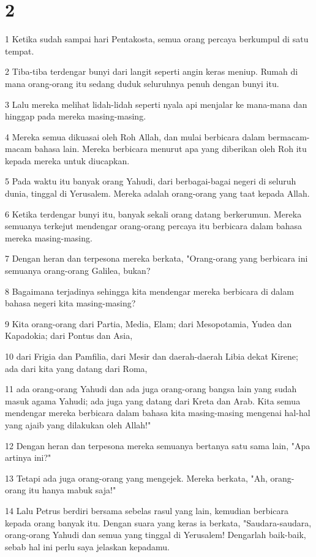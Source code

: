 \chapter{2}

\par 1 Ketika sudah sampai hari Pentakosta, semua orang percaya berkumpul di satu tempat.
\par 2 Tiba-tiba terdengar bunyi dari langit seperti angin keras meniup. Rumah di mana orang-orang itu sedang duduk seluruhnya penuh dengan bunyi itu.
\par 3 Lalu mereka melihat lidah-lidah seperti nyala api menjalar ke mana-mana dan hinggap pada mereka masing-masing.
\par 4 Mereka semua dikuasai oleh Roh Allah, dan mulai berbicara dalam bermacam-macam bahasa lain. Mereka berbicara menurut apa yang diberikan oleh Roh itu kepada mereka untuk diucapkan.
\par 5 Pada waktu itu banyak orang Yahudi, dari berbagai-bagai negeri di seluruh dunia, tinggal di Yerusalem. Mereka adalah orang-orang yang taat kepada Allah.
\par 6 Ketika terdengar bunyi itu, banyak sekali orang datang berkerumun. Mereka semuanya terkejut mendengar orang-orang percaya itu berbicara dalam bahasa mereka masing-masing.
\par 7 Dengan heran dan terpesona mereka berkata, "Orang-orang yang berbicara ini semuanya orang-orang Galilea, bukan?
\par 8 Bagaimana terjadinya sehingga kita mendengar mereka berbicara di dalam bahasa negeri kita masing-masing?
\par 9 Kita orang-orang dari Partia, Media, Elam; dari Mesopotamia, Yudea dan Kapadokia; dari Pontus dan Asia,
\par 10 dari Frigia dan Pamfilia, dari Mesir dan daerah-daerah Libia dekat Kirene; ada dari kita yang datang dari Roma,
\par 11 ada orang-orang Yahudi dan ada juga orang-orang bangsa lain yang sudah masuk agama Yahudi; ada juga yang datang dari Kreta dan Arab. Kita semua mendengar mereka berbicara dalam bahasa kita masing-masing mengenai hal-hal yang ajaib yang dilakukan oleh Allah!"
\par 12 Dengan heran dan terpesona mereka semuanya bertanya satu sama lain, "Apa artinya ini?"
\par 13 Tetapi ada juga orang-orang yang mengejek. Mereka berkata, "Ah, orang-orang itu hanya mabuk saja!"
\par 14 Lalu Petrus berdiri bersama sebelas rasul yang lain, kemudian berbicara kepada orang banyak itu. Dengan suara yang keras ia berkata, "Saudara-saudara, orang-orang Yahudi dan semua yang tinggal di Yerusalem! Dengarlah baik-baik, sebab hal ini perlu saya jelaskan kepadamu.
